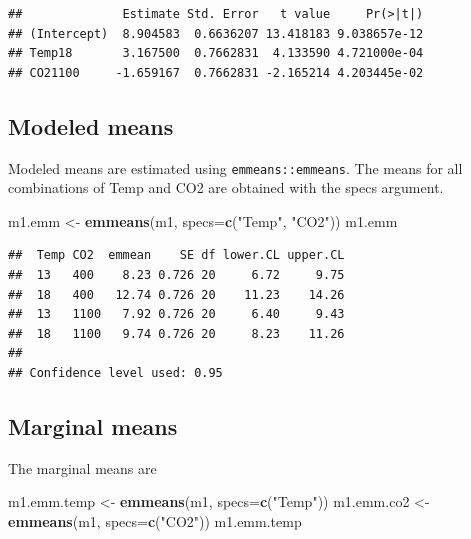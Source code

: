 \documentclass[]{book}
\newenvironment{Shaded}{\begin{snugshade}}{\end{snugshade}}
\newcommand{\KeywordTok}[1]{\textcolor[rgb]{0.13,0.29,0.53}{\textbf{#1}}}
\newcommand{\DataTypeTok}[1]{\textcolor[rgb]{0.13,0.29,0.53}{#1}}
\newcommand{\StringTok}[1]{\textcolor[rgb]{0.31,0.60,0.02}{#1}}
\newcommand{\NormalTok}[1]{#1}
\begin{document}
\begin{verbatim}
##              Estimate Std. Error   t value     Pr(>|t|)
## (Intercept)  8.904583  0.6636207 13.418183 9.038657e-12
## Temp18       3.167500  0.7662831  4.133590 4.721000e-04
## CO21100     -1.659167  0.7662831 -2.165214 4.203445e-02
\end{verbatim}

\subsection{Modeled means}\label{modeled-means}

Modeled means are estimated using \texttt{emmeans::emmeans}. The means
for all combinations of Temp and CO2 are obtained with the specs
argument.

\begin{Shaded}
\begin{Highlighting}[]
\NormalTok{m1.emm <-}\StringTok{ }\KeywordTok{emmeans}\NormalTok{(m1, }\DataTypeTok{specs=}\KeywordTok{c}\NormalTok{(}\StringTok{"Temp"}\NormalTok{, }\StringTok{"CO2"}\NormalTok{))}
\NormalTok{m1.emm}
\end{Highlighting}
\end{Shaded}

\begin{verbatim}
##  Temp CO2  emmean    SE df lower.CL upper.CL
##  13   400    8.23 0.726 20     6.72     9.75
##  18   400   12.74 0.726 20    11.23    14.26
##  13   1100   7.92 0.726 20     6.40     9.43
##  18   1100   9.74 0.726 20     8.23    11.26
## 
## Confidence level used: 0.95
\end{verbatim}

\subsection{Marginal means}\label{marginal-means}

The marginal means are

\begin{Shaded}
\begin{Highlighting}[]
\NormalTok{m1.emm.temp <-}\StringTok{ }\KeywordTok{emmeans}\NormalTok{(m1, }\DataTypeTok{specs=}\KeywordTok{c}\NormalTok{(}\StringTok{"Temp"}\NormalTok{))}
\NormalTok{m1.emm.co2 <-}\StringTok{ }\KeywordTok{emmeans}\NormalTok{(m1, }\DataTypeTok{specs=}\KeywordTok{c}\NormalTok{(}\StringTok{"CO2"}\NormalTok{))}
\NormalTok{m1.emm.temp}
\end{Highlighting}
\end{Shaded}
\end{document}
